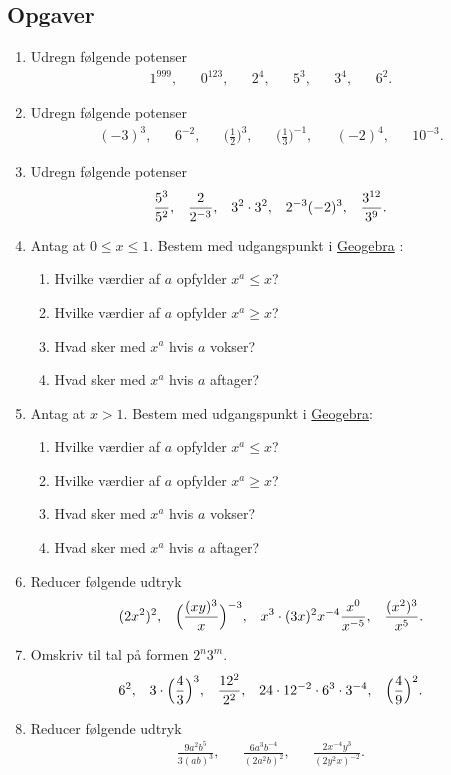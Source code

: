 \subsection{Opgaver}

\begin{enumerate}
\item Udregn følgende potenser
\begin{align*}
1^{999},&&0^{123},&& 2^4,&&5^3,&& 3^4,&& 6^2.
\end{align*}
\item Udregn følgende potenser
\begin{align*}
(-3)^3,&& 6^{-2},&& \Big(\frac{1}{2}\Big)^{3},&& \Big(\frac{1}{3}\Big)^{-1},&& (-2)^4,&& 10^{-3}.
\end{align*}
\item Udregn følgende potenser
\begin{align*}
\frac{5^3}{5^2},&& \frac{2}{2^{-3}},&& 3^2\cdot 3^2,&& 2^{-3}(-2)^3,&& \frac{3^{12}}{3^9}.
\end{align*}
\item Antag at $0\leq x\leq1$. Bestem med udgangspunkt i \href{https://www.geogebra.org/m/Kdr3GHkr}{Geogebra} :
\begin{enumerate}
\item Hvilke værdier af $a$ opfylder $x^a\leq x$?
\item Hvilke værdier af $a$ opfylder $x^a \geq x$?
\item Hvad sker med $x^a$ hvis $a$ vokser?
\item Hvad sker med $x^a$ hvis $a$ aftager?
\end{enumerate}
\item Antag at $x>1$. Bestem med udgangspunkt i \href{https://www.geogebra.org/m/Kdr3GHkr}{Geogebra}:
\begin{enumerate}
\item Hvilke værdier af $a$ opfylder $x^a\leq x$?
\item Hvilke værdier af $a$ opfylder $x^a \geq x$?
\item Hvad sker med $x^a$ hvis $a$ vokser?
\item Hvad sker med $x^a$ hvis $a$ aftager?
\end{enumerate}
 
\item Reducer følgende udtryk
\begin{align*}
(2x^2)^2,&& \Big(\frac{(xy)^{3}}{x}\Big)^{-3},&& x^3\cdot (3x)^2x^{-4} \frac{x^0}{x^{-5}},&& \frac{(x^2)^3}{x^5}.
\end{align*}
\item Omskriv til tal på formen $2^n3^m$.
\begin{align*}
6^2,&& 3\cdot \Big(\frac{4}{3}\Big)^3,&& \frac{12^2}{2^2},&& 24\cdot 12^{-2}\cdot 6^3\cdot 3^{-4},&& \Big(\frac{4}{9}\Big)^{2}.
\end{align*}
\item Reducer følgende udtryk
\begin{align*}
\frac{9a^2b^5}{3(ab)^3},&& \frac{6a^3b^{-4}}{(2a^2b)^2},&& \frac{2x^{-4}y^3}{(2y^2x)^{-2}}.
\end{align*}


\end{enumerate}
